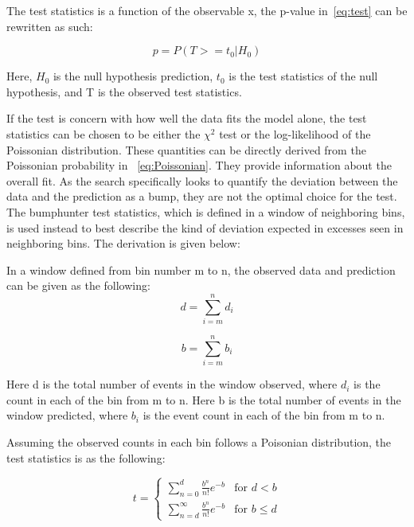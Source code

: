 The test statistics is a function of the observable x, the p-value in~\ref{eq:test} can be rewritten as such:
    
\begin{equation}
    p = P(T>=t_{0}| H_{0})
\label{eq:p-valuetestStats}
\end{equation}

Here, $H_0$ is the null hypothesis prediction, $t_0$ is the test statistics of the null hypothesis, and T is the observed test statistics.


If the test is concern with how well the data fits the model alone, the test statistics can be chosen to be either the $\chi^{2}$ test or the log-likelihood of the Poissonian distribution. These quantities can be directly derived from the Poissonian probability in ~\ref{eq:Poissonian}. They provide information about the overall fit. As the search specifically looks to quantify the deviation between the data and the prediction as a bump, they are not the optimal choice for the test. 
The bumphunter test statistics, which is defined in a window of neighboring bins, is used instead to best describe the kind of deviation expected in excesses seen in neighboring bins. The derivation is given below: 

In a window defined from bin number m to n, the observed data and prediction can be given as the following: 
    \begin{equation}
         d= \sum_{i=m}^{n} d_i 
    \end{equation}

    
    \begin{equation}
         b= \sum_{i=m}^{n} b_i
    \end{equation}

    Here d is the total number of events in the window observed, where $d_i$ is the count in each of the bin from m to n. 
    Here b is the total number of events in the window predicted, where $b_i$ is the event count in each of the bin from m to n.
    
    Assuming the observed counts in each bin follows a Poisonian distribution, the test statistics is as the following:

	\begin{equation}
    t=
    \begin{cases} \sum_{n=0}^{d} \frac{b^{n}}{n!} e^{-b} &  \textrm{for $d < b$}
    \\
    \sum_{n=d}^{\infty} \frac{b^n}{n!} e^{-b} &  \textrm{for $b \leq d$}
    \end{cases}
    \end{equation}

